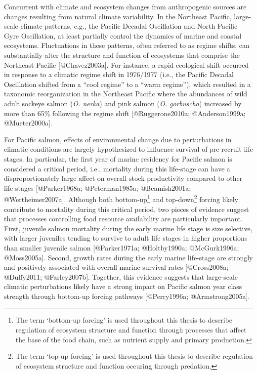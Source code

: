 Concurrent with climate and ecosystem changes from anthropogenic sources
are changes resulting from natural climate variability. In the Northeast
Pacific, large-scale climate patterns, e.g., the Pacific Decadal
Oscillation and North Pacific Gyre Oscillation, at least partially
control the dynamics of marine and coastal ecosystems. Fluctuations in
these patterns, often referred to as regime shifts, can substantially
alter the structure and function of ecosystems that comprise the
Northeast Pacific {[}@Chavez2003a{]}. For instance, a rapid ecological
shift occurred in response to a climatic regime shift in 1976/1977
(i.e., the Pacific Decadal Oscillation shifted from a ``cool regime'' to
a ``warm regime''), which resulted in a taxonomic reorganization in the
Northeast Pacific where the abundances of wild adult sockeye salmon
(\emph{O. nerka}) and pink salmon (\emph{O. gorbuscha}) increased by
more than 65\% following the regime shift {[}@Ruggerone2010a;
@Anderson1999a; @Mueter2000a{]}.

For Pacific salmon, effects of environmental change due to perturbations
in climatic conditions are largely hypothesized to influence survival of
pre-recruit life stages. In particular, the first year of marine
residency for Pacific salmon is considered a critical period, i.e.,
mortality during this life-stage can have a disproportionately large
affect on overall stock productivity compared to other life-stages
{[}@Parker1968a; @Peterman1985a; @Beamish2001a; @Wertheimer2007a{]}.
Although both bottom-up\footnote{The term `bottom-up forcing' is used
  throughout this thesis to describe regulation of ecosystem structure
  and function through processes that affect the base of the food chain,
  such as nutrient supply and primary production.} and
top-down\footnote{The term `top-up forcing' is used throughout this
  thesis to describe regulation of ecosystem structure and function
  occuring through predation.} forcing likely contribute to mortality
during this critical period, two pieces of evidence suggest that
processes controlling food resource availability are particularly
important. First, juvenile salmon mortality during the early marine life
stage is size selective, with larger juveniles tending to survive to
adult life stages in higher proportions than smaller juvenile salmon
{[}@Parker1971a; @Holtby1990a; @McGurk1996a; @Moss2005a{]}. Second,
growth rates during the early marine life-stage are strongly and
positively associated with overall marine survival rates {[}@Cross2008a;
@Duffy2011; @Farley2007b{]}. Together, this evidence suggests that
large-scale climatic perturbations likely have a strong impact on
Pacific salmon year class strength through bottom-up forcing pathways
{[}@Perry1996a; @Armstrong2005a{]}.


